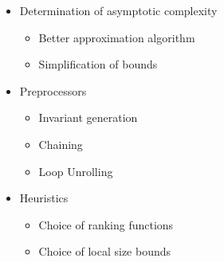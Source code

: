\begin{itemize}[<+->]
\item Determination of asymptotic complexity
  \begin{itemize}
    \item Better approximation algorithm
    \item Simplification of bounds
  \end{itemize}
\item Preprocessors
  \begin{itemize}
  \item Invariant generation
  \item Chaining
  \item Loop Unrolling
  \end{itemize}
\item Heuristics
  \begin{itemize}
  \item Choice of ranking functions
  \item Choice of local size bounds
  \end{itemize}
\end{itemize}
